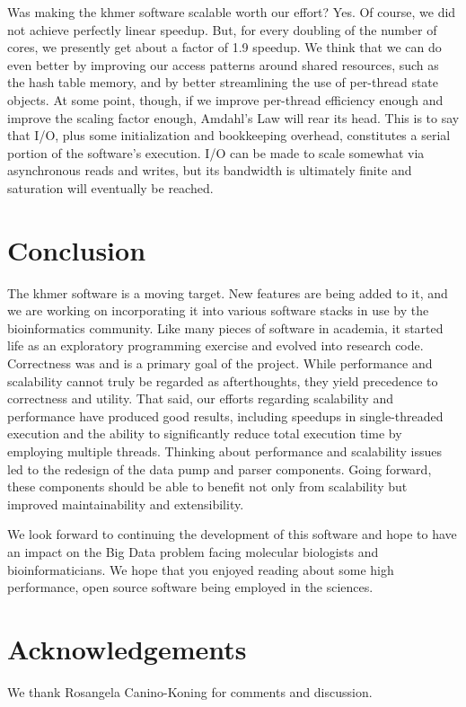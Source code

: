\documentclass{article}
\begin{document}
Was making the khmer software scalable worth our effort? Yes. Of course, we did not achieve perfectly linear speedup. But, for every doubling of the number of cores, we presently get about a factor of 1.9 speedup. We think that we can do even better by improving our access patterns around shared resources, such as the hash table memory, and by better streamlining the use of per-thread state objects. At some point, though, if we improve per-thread efficiency enough and improve the scaling factor enough, Amdahl's Law \citep{web:Amdahl} will rear its head. This is to say that I/O, plus some initialization and bookkeeping overhead, constitutes a serial portion of the software's execution. I/O can be made to scale somewhat via asynchronous reads and writes, but its bandwidth is ultimately finite and saturation will eventually be reached.


\section{Conclusion}

The khmer software is a moving target. New features are being added to it, and we are working on incorporating it into various software stacks in use by the bioinformatics community. Like many pieces of software in academia, it started life as an exploratory programming exercise and evolved into research code. Correctness was and is a primary goal of the project. While performance and scalability cannot truly be regarded as afterthoughts, they yield precedence to correctness and utility. That said, our efforts regarding scalability and performance have produced good results, including speedups in single-threaded execution and the ability to significantly reduce total execution time by employing multiple threads. Thinking about performance and scalability issues led to the redesign of the data pump and parser components. Going forward, these components should be able to benefit not only from scalability but improved maintainability and extensibility.

We look forward to continuing the development of this software and hope to have an impact on the Big Data problem facing molecular biologists and bioinformaticians. We hope that you enjoyed reading about some high performance, open source software being employed in the sciences.

\section{Acknowledgements}

We thank Rosangela Canino-Koning for comments and discussion.



\end{document}
